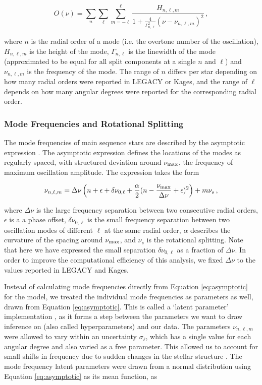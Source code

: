 \documentclass[12pt]{article}
\newcommand{\numax}{\mbox{$\nu_{\rm max}$}\xspace}
\newcommand{\dnu}{\mbox{$\Delta \nu$}\xspace}
\begin{document}
\begin{equation}
	O(\nu) = \sum_n \sum_\ell \sum_{m=-\ell}^\ell \frac{H_{n,\ell,m}}{1 + \frac{4}{\Gamma^2_{n,\ell}}(\nu - \nu_{n,\ell,m})^2}\, ,
\end{equation}

\noindent where $n$ is the radial order of a mode (i.e. the overtone number of the oscillation), $H_{n,\ell,m}$ is the height of the mode, $\Gamma_{n,\ell}$ is the linewidth of the mode (approximated to be equal for all split components at a single $n$ and $\ell$) and $\nu_{n, \ell, m}$ is the frequency of the mode. The range of $n$ differs per star depending on how many radial orders were reported in LEGACY or Kages, and the range of $\ell$ depends on how many angular degrees were reported for the corresponding radial order.

\subsubsection{Mode Frequencies and Rotational Splitting}\label{ssec:frequencies}
The mode frequencies of main sequence stars are described by the asymptotic expression \cite{tassoul1980, vrard+2016}. The asymptotic expression defines the locations of the modes as regularly spaced, with structured deviation around \numax, the frequency of maximum oscillation amplitude. The expression takes the form

\begin{equation}\label{eq:asymptotic}
	\nu_{n,\ell,m} = \dnu\left(n + \epsilon + \delta\nu_{0,\ell} + \frac{\alpha}{2}(n - \frac{\numax}{\dnu} + \epsilon)^2\right) + m\nu_{s}\, ,
\end{equation}

\noindent where \dnu is the large frequency separation between two consecutive radial orders, $\epsilon$ is a a phase offset, $\delta\nu_{0,\ell}$ is the small frequency separation between two oscillation modes of different $\ell$ at the same radial order, $\alpha$ describes the curvature of the spacing around \numax, and $\nu_s$ is the rotational splitting. Note that here we have expressed the small separation $\delta\nu_{0,\ell}$ as a fraction of $\dnu$. In order to improve the computational efficiency of this analysis, we fixed \dnu to the values reported in LEGACY and Kages.

Instead of calculating mode frequencies directly from Equation \ref{eq:asymptotic} for the model, we treated the individual mode frequencies as parameters as well, drawn from Equation \ref{eq:asymptotic}. This is called a `latent parameter' implementation \cite{hogg2012, hall+2019}, as it forms a step between the parameters we want to draw inference on (also called hyperparameters) and our data. 
The parameters $\nu_{n,\ell,m}$ were allowed to vary within an uncertainty $\sigma_{\ell}$, which has a single value for each angular degree and also varied as a free parameter.
This allowed us to account for small shifts in frequency due to sudden changes in the stellar structure \cite[called acoustic glitches]{mazumdar+2014}. The mode frequency latent parameters were drawn from a normal distribution using Equation \ref{eq:asymptotic} as its mean function, as
\end{document}
